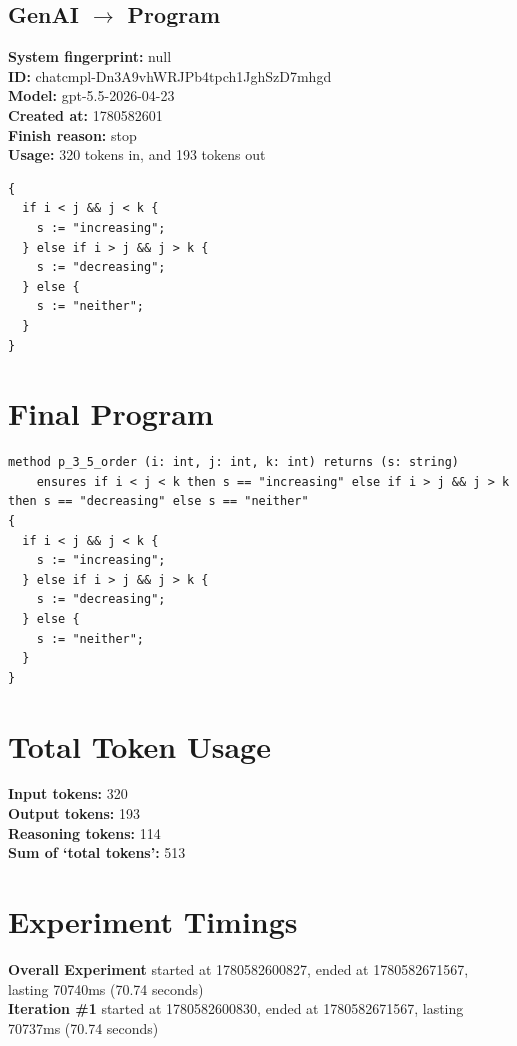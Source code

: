 \documentclass{article}
\begin{document}
\subsection*{GenAI $\rightarrow$ Program}
\textbf{System fingerprint: }null
\\\textbf{ID: }chatcmpl-Dn3A9vhWRJPb4tpch1JghSzD7mhgd
\\\textbf{Model: }gpt-5.5-2026-04-23
\\\textbf{Created at: }1780582601
\\\textbf{Finish reason: }stop
\\\textbf{Usage: }320 tokens in, and 193 tokens out
\begin{lstlisting}
{
  if i < j && j < k {
    s := "increasing";
  } else if i > j && j > k {
    s := "decreasing";
  } else {
    s := "neither";
  }
}
\end{lstlisting}
\section*{Final Program}
\begin{lstlisting}
method p_3_5_order (i: int, j: int, k: int) returns (s: string)
	ensures if i < j < k then s == "increasing" else if i > j && j > k then s == "decreasing" else s == "neither"
{
  if i < j && j < k {
    s := "increasing";
  } else if i > j && j > k {
    s := "decreasing";
  } else {
    s := "neither";
  }
}
\end{lstlisting}
\section*{Total Token Usage}
\textbf{Input tokens: }320
\\\textbf{Output tokens: }193
\\\textbf{Reasoning tokens: }114
\\\textbf{Sum of `total tokens': }513
\section*{Experiment Timings}
\textbf{Overall Experiment} started at 1780582600827, ended at 1780582671567, lasting 70740ms (70.74 seconds)
\\\textbf{Iteration \#1} started at 1780582600830, ended at 1780582671567, lasting 70737ms (70.74 seconds)
\end{document}
